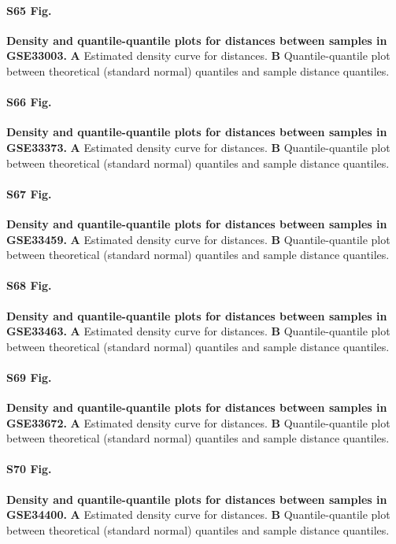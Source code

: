 \documentclass[10pt,letterpaper]{article}
\begin{document}
\paragraph*{S65 Fig.}
\hypertarget{S65_Fig}{
{\bf Density and quantile-quantile plots for distances between samples in GSE33003.} \textbf{A} Estimated density curve for distances. \textbf{B} Quantile-quantile plot between theoretical (standard normal) quantiles and sample distance quantiles.}

\paragraph*{S66 Fig.}
\hypertarget{S66_Fig}{
{\bf Density and quantile-quantile plots for distances between samples in GSE33373.} \textbf{A} Estimated density curve for distances. \textbf{B} Quantile-quantile plot between theoretical (standard normal) quantiles and sample distance quantiles.}

\paragraph*{S67 Fig.}
\hypertarget{S67_Fig}{
{\bf Density and quantile-quantile plots for distances between samples in GSE33459.} \textbf{A} Estimated density curve for distances. \textbf{B} Quantile-quantile plot between theoretical (standard normal) quantiles and sample distance quantiles.}

\paragraph*{S68 Fig.}
\hypertarget{S68_Fig}{
{\bf Density and quantile-quantile plots for distances between samples in GSE33463.} \textbf{A} Estimated density curve for distances. \textbf{B} Quantile-quantile plot between theoretical (standard normal) quantiles and sample distance quantiles.}

\paragraph*{S69 Fig.}
\hypertarget{S69_Fig}{
{\bf Density and quantile-quantile plots for distances between samples in GSE33672.} \textbf{A} Estimated density curve for distances. \textbf{B} Quantile-quantile plot between theoretical (standard normal) quantiles and sample distance quantiles.}

\paragraph*{S70 Fig.}
\hypertarget{S70_Fig}{
{\bf Density and quantile-quantile plots for distances between samples in GSE34400.} \textbf{A} Estimated density curve for distances. \textbf{B} Quantile-quantile plot between theoretical (standard normal) quantiles and sample distance quantiles.}
\end{document}
